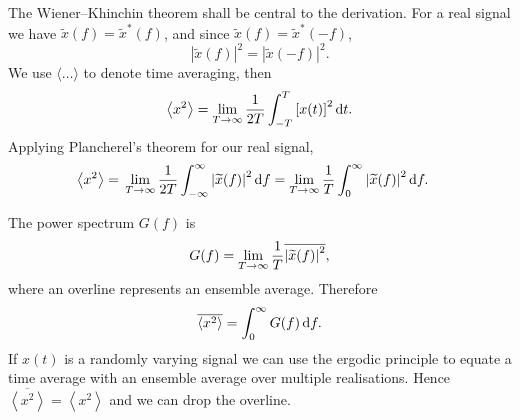 The Wiener--Khinchin theorem \citep[chapter 28]{Kittel1958} shall be central to the derivation. For a real signal we have $\widetilde{x}(f) = \widetilde{x}^\ast(f)$, and since $\widetilde{x}(f) = \widetilde{x}^\ast(-f)$,
\begin{equation}
\left|\widetilde{x}(f)\right|^2 = \left|\widetilde{x}(-f)\right|^2.
\end{equation}
We use $\langle\ldots\rangle$ to denote time averaging, then
\begin{equation}
\left\langle x^2\right\rangle = \lim_{T \rightarrow \infty} \dfrac{1}{2T} \int_{-T}^{T}{\left[x(t)\right]^2}\,\mathrm{d}{t}.
\end{equation}
Applying Plancherel's theorem for our real signal,
\begin{align}
\left\langle x^2\right\rangle = {} & \lim_{T \rightarrow \infty} \dfrac{1}{2T} \int_{-\infty}^{\infty}{\left|\widetilde{x}(f)\right|^2}\,\mathrm{d}{f} = \lim_{T \rightarrow \infty} \dfrac{1}{T} \int_{0}^{\infty}{\left|\widetilde{x}(f)\right|^2}\,\mathrm{d}{f}.
\end{align}

The power spectrum $G(f)$ is
\begin{equation}
G(f) = \lim_{T \rightarrow \infty} \dfrac{1}{T} \overline{\left|\widetilde{x}(f)\right|^2},
\end{equation}
where an overline represents an ensemble average. Therefore
\begin{equation}
\overline{\left\langle x^2\right\rangle} = \int_{0}^{\infty}{G(f)}\,\mathrm{d}{f}.
\end{equation}
If $x(t)$ is a randomly varying signal we can use the ergodic principle to equate a time average with an ensemble average over multiple realisations. Hence $\overline{\left\langle x^2\right\rangle} = \left\langle x^2\right\rangle$ and we can drop the overline.

